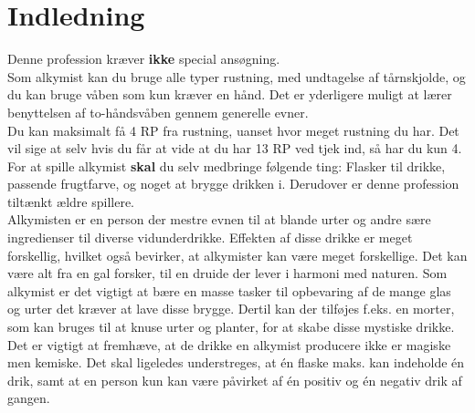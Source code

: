 
\chapter{Indledning}

Denne profession kræver \textbf{ikke} special ansøgning.\\
Som alkymist kan du bruge alle typer rustning, med undtagelse af tårnskjolde, og du kan bruge våben som kun kræver en hånd. Det er yderligere muligt at lærer benyttelsen af to-håndsvåben gennem generelle evner.\\
Du kan maksimalt få 4 RP fra rustning, uanset hvor meget rustning du har. Det vil sige at selv hvis du får at vide at du har 13 RP ved tjek ind, så har du kun 4.\\

For at spille alkymist \textbf{skal} du selv medbringe følgende ting: Flasker til drikke, passende frugtfarve, og noget at brygge drikken i. Derudover er denne profession tiltænkt ældre spillere.\\

Alkymisten er en person der mestre evnen til at blande urter og andre sære ingredienser til diverse vidunderdrikke. Effekten af disse drikke er meget forskellig, hvilket også bevirker, at alkymister kan være meget forskellige. Det kan være alt fra en gal forsker, til en druide der lever i harmoni med naturen.
Som alkymist er det vigtigt at bære en masse tasker til opbevaring af de mange glas og urter det kræver at lave disse brygge. Dertil kan der tilføjes f.eks. en morter, som kan bruges til at knuse urter og planter, for at skabe disse mystiske drikke.\\
Det er vigtigt at fremhæve, at de drikke en alkymist producere ikke er magiske men kemiske. Det skal ligeledes understreges, at én flaske maks. kan indeholde én drik, samt at en person kun kan være påvirket af én positiv og én negativ drik af gangen.\\